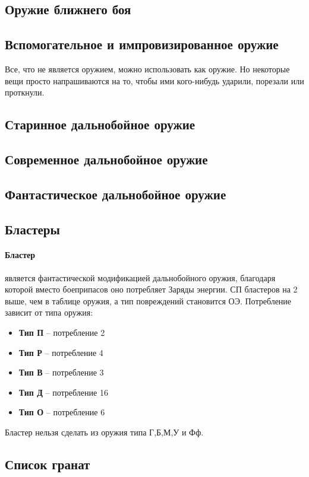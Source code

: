 \subsection{Оружие ближнего боя}

\subsection{Вспомогательное и импровизированное оружие}
Все, что не является оружием, можно использовать как оружие. Но некоторые вещи просто напрашиваются на то, чтобы ими кого-нибудь ударили, порезали или проткнули.

\subsection{Старинное дальнобойное оружие}

\subsection{Современное дальнобойное оружие}

\subsection{Фантастическое дальнобойное оружие}

\subsection{Бластеры}
\paragraph{Бластер} является фантастической модификацией дальнобойного оружия, благодаря которой вместо боеприпасов оно потребляет Заряды энергии. СП бластеров на 2 выше, чем в таблице оружия, а тип повреждений становится ОЭ. Потребление зависит от типа оружия:
\begin{itemize}
\item \textbf{Тип П} -- потребление 2
\item \textbf{Тип Р} -- потребление 4
\item \textbf{Тип В} -- потребление 3
\item \textbf{Тип Д} -- потребление 16
\item \textbf{Тип О} -- потребление 6
\end{itemize}
Бластер нельзя сделать из оружия типа Г,Б,М,У и Фф.

\printindex[weapons]


\subsection{Список гранат}
